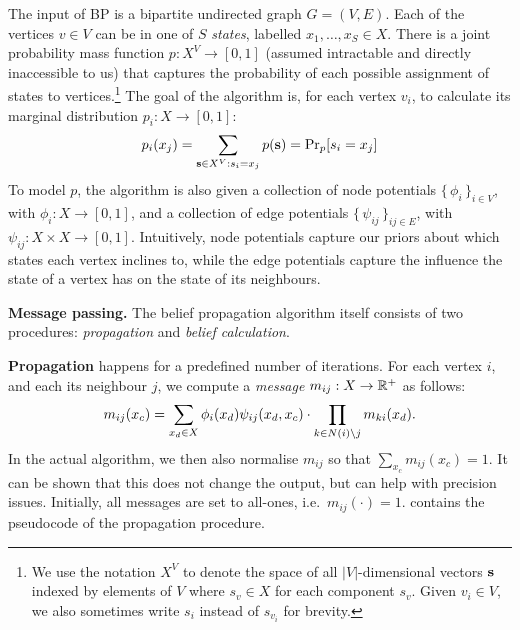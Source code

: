 \documentclass[letterpaper]{article}
\newcommand{\mypar}[1]{{\bf #1.}}
\newcommand{\myparcont}[1]{{\bf #1}}
\begin{document}
The input of BP is a bipartite undirected graph $G = (V, E)$. Each of the
vertices $v\in V$ can be in one of $S$ \emph{states}, labelled $x_1, \ldots,
x_S \in X$. There is a joint probability mass function $p: X^V \to [0, 1]$
(assumed intractable and directly inaccessible to us) that captures the probability of
each possible assignment of states to vertices.\footnote{We use the notation
$X^V$ to denote the space of all $|V|$-dimensional vectors $\ves$ indexed by
elements of $V$ where $s_v\in X$ for each component $s_v$. Given $v_i \in V$, we
also sometimes write $s_i$ instead of $s_{v_i}$ for brevity.} The goal of the
algorithm is, for each vertex $v_i$, to calculate its marginal distribution
$p_i: X \to [0, 1]$:
%
$$p_i(x_j) = \sum_{\ves \in X^V: s_i = x_j} p(\ves) = \Pr_p[s_i = x_j]$$
%
To model $p$, the algorithm is also given a collection of node potentials
$\{\,\phi_i\,\}_{i \in V}$, with $\phi_i: X \to [0, 1]$, and a collection of edge
potentials $\{\,\psi_{ij}\,\}_{ij \in E}$, with $\psi_{ij}: X\times X \to [0, 1]$.
Intuitively, node potentials capture our priors about which states each vertex
inclines to, while the edge potentials capture the influence the state of a
vertex has on the state of its neighbours.


\mypar{Message passing} The belief propagation algorithm itself consists of two
procedures: \emph{propagation} and \emph{belief calculation}.

\myparcont{Propagation} happens for a predefined number of iterations. For each vertex $i$, and each its neighbour $j$, we compute a \emph{message} $m_{ij} : X \to \mathbb{R}^+$ as follows:
%
$$m_{ij}(x_c) = \sum_{x_d \in X} \phi_i(x_d)\psi_{ij}(x_d, x_c) \cdot \prod_{k \in N(i) \setminus j} m_{ki}(x_d).$$
%
In the actual algorithm, we then also normalise $m_{ij}$ so that $\sum_{x_c}
m_{ij}(x_c) = 1$. It can be shown that this does not change the output, but can
help with precision issues. Initially, all messages are set to all-ones,
i.e.~$m_{ij}(\cdot) = 1$.
%
 contains the pseudocode of the propagation procedure.
\end{document}
